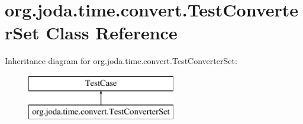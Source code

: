 \hypertarget{classorg_1_1joda_1_1time_1_1convert_1_1_test_converter_set}{\section{org.\-joda.\-time.\-convert.\-Test\-Converter\-Set Class Reference}
\label{classorg_1_1joda_1_1time_1_1convert_1_1_test_converter_set}
}
Inheritance diagram for org.\-joda.\-time.\-convert.\-Test\-Converter\-Set\-:\begin{figure}[H]
\begin{center}
\leavevmode
\includegraphics[height=2.000000cm]{classorg_1_1joda_1_1time_1_1convert_1_1_test_converter_set}
\end{center}
\end{figure}
